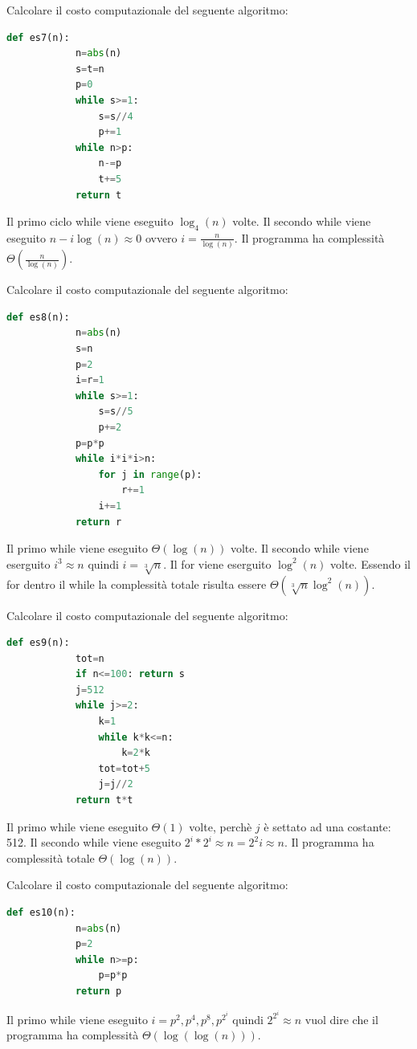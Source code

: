 \begin{exercise}
    Calcolare il costo computazionale del seguente algoritmo:
    \begin{lstlisting}[language=Python]
        def es7(n):
            n=abs(n)
            s=t=n
            p=0
            while s>=1:
                s=s//4
                p+=1
            while n>p:
                n-=p
                t+=5
            return t
    \end{lstlisting}
    
    Il primo ciclo while viene eseguito $\log_4(n)$ volte. Il secondo while viene eseguito $n-i\log(n)\approx0$ ovvero $i=\frac{n}{\log(n)}$. Il programma ha complessità $\Theta(\frac{n}{\log(n)})$.
\end{exercise}

\begin{exercise}
    Calcolare il costo computazionale del seguente algoritmo:
    \begin{lstlisting}[language=Python]
        def es8(n):
            n=abs(n)
            s=n
            p=2
            i=r=1
            while s>=1:
                s=s//5
                p+=2
            p=p*p
            while i*i*i>n:
                for j in range(p):
                    r+=1
                i+=1
            return r
    \end{lstlisting}
    
    Il primo while viene eseguito $\Theta(\log(n))$ volte. Il secondo while viene eserguito $i^3\approx n$ quindi $i=\sqrt[3]{n}$. Il for viene eserguito $\log^2(n)$ volte. Essendo il for dentro il while la complessità totale risulta essere $\Theta(\sqrt[3]{n}\log^2(n))$.
\end{exercise}

\begin{exercise}
    Calcolare il costo computazionale del seguente algoritmo:
    \begin{lstlisting}[language=Python]
        def es9(n):
            tot=n
            if n<=100: return s
            j=512
            while j>=2:
                k=1
                while k*k<=n:
                    k=2*k
                tot=tot+5
                j=j//2
            return t*t
    \end{lstlisting}
    
    Il primo while viene eseguito $\Theta(1)$ volte, perchè $j$ è settato ad una costante: 512. Il secondo while viene eseguito $2^i*2^i\approx n=2^2i\approx n$. Il programma ha complessità totale $\Theta(\log(n))$.
\end{exercise}

\begin{exercise}
    Calcolare il costo computazionale del seguente algoritmo:
    \begin{lstlisting}[language=Python]
        def es10(n):
            n=abs(n)
            p=2
            while n>=p:
                p=p*p
            return p
    \end{lstlisting}
    
    Il primo while viene eseguito $i=p^2,p^4,p^8,p^{2^i}$ quindi $2^{2^i}\approx n$ vuol dire che il programma ha complessità $\Theta(\log(\log(n)))$.
\end{exercise}

